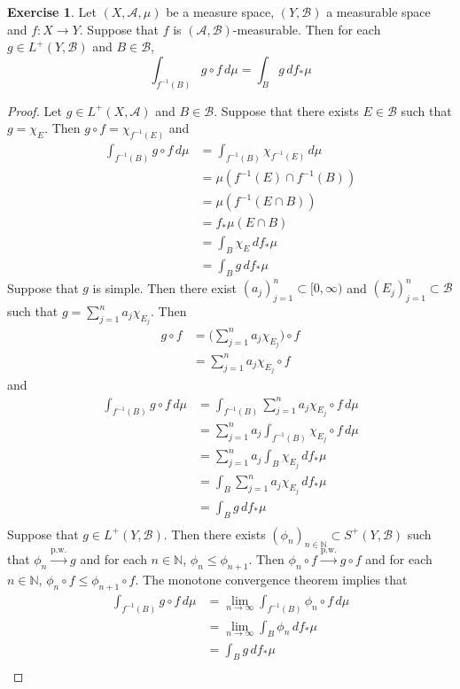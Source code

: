 \documentclass[12pt]{amsart}
\theoremstyle{definition}
\newtheorem{ex}[definition]{Exercise}
\newcommand{\N}{\mathbb{N}}
\newcommand{\MA}{\mathcal{A}}
\newcommand{\MB}{\mathcal{B}}
\newcommand{\dmu}{\, d \mu}
\newcommand{\Rg}{[0,\infty)}
\newcommand{\limn}{\lim \limits_{n \rightarrow \infty}}
\newcommand{\convt}[1]{\xrightarrow{\text{#1}}}
\begin{document}
	\begin{ex}
		Let $(X, \MA, \mu)$ be a measure space, $(Y, \MB)$ a measurable space and $f: X \rightarrow Y$. Suppose that $f$ is $(\MA, \MB)$-measurable. Then for each $g \in L^+(Y, \MB)$ and $B \in \MB$, $$\int_{f^{-1}(B)} g \circ f \dmu = \int_B g \, d f_*\mu$$
	\end{ex}

	\begin{proof}
		Let $g \in  L^+(X, \MA)$ and $B \in \MB$. Suppose that there exists $E \in \MB$ such that $g = \chi_E$. Then $g \circ f = \chi_{f^{-1}(E)}$ and
		\begin{align*}
			\int_{f^{-1}(B)} g \circ f \dmu
			& = \int_{f^{-1}(B)} \chi_{f^{-1}(E)} \dmu \\
			& = \mu(f^{-1}(E) \cap f^{-1}(B)) \\
			& = \mu( f^{-1}(E \cap B)) \\
			& = f_*\mu (E \cap B) \\
			& = \int_{B} \chi_{E} \, df_*\mu \\
			& = \int_{B} g \, df_*\mu 
 		\end{align*}
 		Suppose that $g$ is simple. Then there exist $(a_j)_{j=1}^n \subset \Rg$ and $(E_j)_{j=1}^n \subset \MB$ such that $g = \sum\limits_{j=1}^n a_j \chi_{E_j}$. 
 		Then 
 		\begin{align*}
 			g \circ f 
 			& = \bigg( \sum\limits_{j=1}^n a_j \chi_{E_j} \bigg) \circ f\\
 			& = \sum\limits_{j=1}^n a_j \chi_{E_j} \circ f
 		\end{align*}
 		and 
 		\begin{align*}
 			\int_{f^{-1}(B)} g \circ f \dmu
 			& = \int_{f^{-1}(B)} \sum\limits_{j=1}^n a_j \chi_{E_j} \circ f \dmu \\
 			& = \sum_{j=1}^n a_j \int_{f^{-1}(B)} \chi_{E_j} \circ f \dmu \\
 			& = \sum_{j=1}^n a_j \int_{B} \chi_{E_j} \, d f_*\mu \\
 			& = \int_{B} \sum_{j=1}^n a_j  \chi_{E_j} \, d f_*\mu \\
 			& = \int_{B} g \, d f_*\mu \\
 		\end{align*}
 		Suppose that $g \in L^+(Y, \MB)$. Then there exists $(\phi_n)_{n \in \N} \subset S^+(Y, \MB)$ such that $\phi_n \convt{p.w.} g$ and for each $n \in \N$, $\phi_n \leq \phi_{n+1}$. Then $\phi_n \circ f \convt{p.w.} g \circ f$ and for each $n \in \N$, $\phi_n \circ f \leq \phi_{n+1} \circ f$. The monotone convergence theorem implies that 
 		\begin{align*}
 			\int_{f^{-1}(B)} g \circ f \dmu
 			& = \limn \int_{f^{-1}(B)} \phi_n \circ f \dmu \\
 			& = \limn \int_{B} \phi_n \, d f_*\mu \\
 			& = \int_{B} g \, d f_*\mu \\
 		\end{align*}
	\end{proof}
\end{document}
